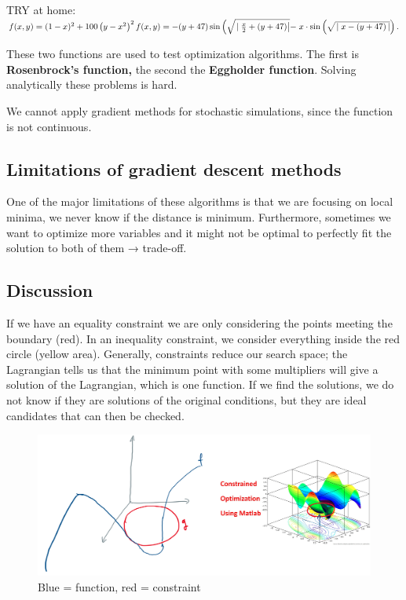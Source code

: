 TRY at
home:$f(x, y)=(1-x)^2+100\left(y-x^2\right)^2 \\ f(x, y)=-(y+47) \sin \left(\sqrt{\left.\mid \frac{x}{2}+(y+47)\right|}-\right. x \cdot \sin \left(\sqrt{\left.\mid x-(y+47\right)|}\right).$

These two functions are used to test optimization algorithms. The first
is \textbf{Rosenbrock's function,} the second the \textbf{Eggholder
function}. Solving analytically these problems is hard.

We cannot apply gradient methods for stochastic simulations, since the
function is not continuous.

\hypertarget{limitations-of-gradient-descent-methods}{%
\subsection{Limitations of gradient descent
methods}\label{limitations-of-gradient-descent-methods}}

One of the major limitations of these algorithms is that we are focusing
on local minima, we never know if the distance is minimum. Furthermore,
sometimes we want to optimize more variables and it might not be optimal
to perfectly fit the solution to both of them → trade-off.

\hypertarget{discussion}{%
\subsection{Discussion}\label{discussion}}

If we have an equality constraint we are only considering the points
meeting the boundary (red). In an inequality constraint, we consider
everything inside the red circle (yellow area). Generally, constraints
reduce our search space; the Lagrangian tells us that the minimum point
with some multipliers will give a solution of the Lagrangian, which is
one function. If we find the solutions, we do not know if they are
solutions of the original conditions, but they are ideal candidates that
can then be checked.

\begin{figure}
\centering
\includegraphics{example.png}
\caption{Blue = function, red = constraint}
\end{figure}

